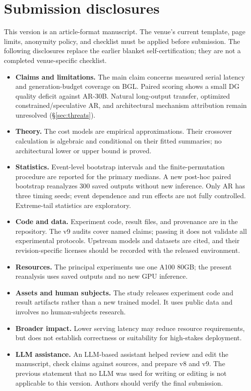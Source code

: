 \section*{Submission disclosures}
\label{app:neurips_checklist}

This version is an article-format manuscript. The venue's current template,
page limits, anonymity policy, and checklist must be applied before
submission. The following disclosures replace the earlier blanket
self-certification; they are not a completed venue-specific checklist.

\begin{itemize}
\item \textbf{Claims and limitations.} The main claim concerns measured
serial latency and generation-budget coverage on BGL. Paired scoring shows
a small DG quality deficit against AR-30B. Natural long-output
transfer, optimized constrained/speculative AR, and architectural mechanism
attribution remain unresolved (\S\ref{sec:threats}).
\item \textbf{Theory.} The cost models are empirical approximations.
Their crossover calculation is algebraic and conditional on their fitted
summaries; no architectural lower or upper bound is proved.
\item \textbf{Statistics.} Event-level bootstrap intervals and the
finite-permutation procedure are reported for the primary medians. A new
post-hoc paired bootstrap reanalyzes 300 saved outputs without new inference.
Only AR has three timing seeds; event dependence and run effects are not
fully controlled. Extreme-tail statistics are exploratory.
\item \textbf{Code and data.} Experiment code, result files, and
provenance are in the repository. The v9 audits cover named claims;
passing it does not validate all experimental protocols. Upstream models
and datasets are cited, and their revision-specific licenses should be
recorded with the released environment.
\item \textbf{Resources.} The principal experiments use one A100 80GB;
the present reanalysis uses saved outputs and no new GPU inference.
\item \textbf{Assets and human subjects.} The study releases experiment
code and result artifacts rather than a new trained model. It uses public
data and involves no human-subjects research.
\item \textbf{Broader impact.} Lower serving latency may reduce resource
requirements, but does not establish correctness or suitability for
high-stakes deployment.
\item \textbf{LLM assistance.} An LLM-based assistant helped review and
edit the manuscript, check claims against sources, and prepare v8 and v9. The
previous statement that no LLM was used for writing or editing is not
applicable to this version. Authors should verify the final submission.
\end{itemize}
